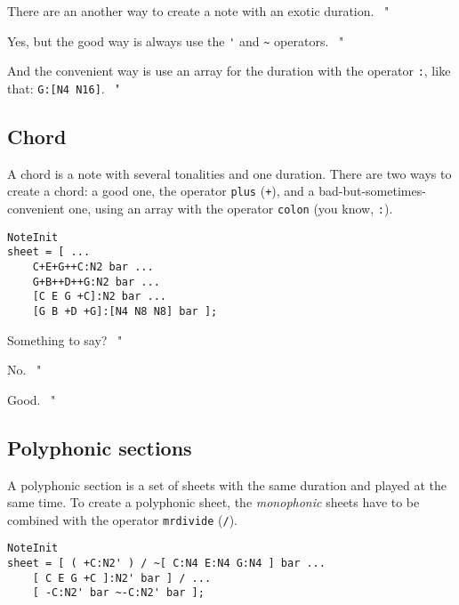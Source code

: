 \documentclass{article}
\newenvironment{meenv}{ \par \noindent \makebox[6em][r]{ \textcolor{mecolor}{Me}: " --~}}{~"}
\newenvironment{myselfenv}{ \par \noindent \makebox[6em][r]{ \textcolor{myselfcolor}{Myself}: " --~}}{~"}
\newcommand{ \me }[1]{%
\begin{meenv}%
	#1%
\end{meenv} }
\newcommand{ \myself }[1]{%
\begin{myselfenv}%
	#1%
\end{myselfenv} }
\begin{document}
\me{There are an another way to create a note with an exotic duration.}
\begin{myselfenv}%
	Yes, but the good way is always use the \lstinline!'! and \lstinline!~! operators.%
\end{myselfenv}
\begin{meenv}%
	And the convenient way is use an array for the duration with the operator \lstinline!:!, like that: \lstinline!G:[N4 N16]!.%
\end{meenv}

\subsection{Chord}

A chord is a note with several tonalities and one duration. There are two ways to create a chord: a good one, the operator \lstinline!plus! (\lstinline!+!), and a bad-but-sometimes-convenient one, using an array with the operator \lstinline!colon! (you know, \lstinline!:!). \\

\begin{lstlisting}
NoteInit
sheet = [ ...
	C+E+G++C:N2 bar ...
	G+B++D++G:N2 bar ...
	[C E G +C]:N2 bar ...
	[G B +D +G]:[N4 N8 N8] bar ];
\end{lstlisting}

\myself{Something to say?}
\me{No.}
\myself{Good.}

\subsection{Polyphonic sections}
\label{sec:TutoPolyphonic}

A polyphonic section is a set of sheets with the same duration and played at the same time. To create a polyphonic sheet, the \emph{monophonic} sheets have to be combined with the operator \lstinline!mrdivide! (\lstinline!/!). \\
\begin{lstlisting}
NoteInit
sheet = [ ( +C:N2' ) / ~[ C:N4 E:N4 G:N4 ] bar ...
	[ C E G +C ]:N2' bar ] / ...
	[ -C:N2' bar ~-C:N2' bar ];
\end{lstlisting}
\end{document}

